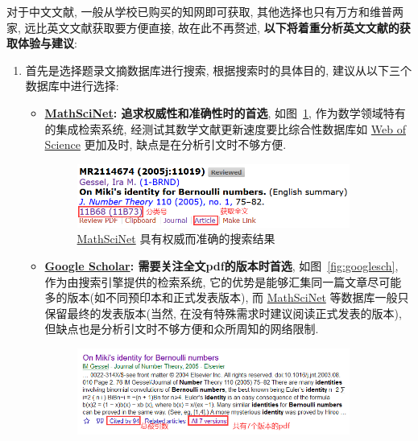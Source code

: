 \documentclass{formatBook}
\begin{document}
对于中文文献, 一般从学校已购买的知网即可获取, 其他选择也只有万方和维普两家, 远比英文文献获取要方便直接, 故在此不再赘述, \textbf{以下将着重分析英文文献的获取体验与建议}:
\begin{enumerate}
    \item 首先是选择题录文摘数据库进行搜索, 根据搜索时的具体目的, 建议从以下三个数据库中进行选择:
          \begin{itemize}
              \item \textbf{\href{https://mathscinet.ams.org/mathscinet}{MathSciNet}: 追求权威性和准确性时的首选}, 如图~\ref{fig:mathscinet}, 作为数学领域特有的集成检索系统, 经测试其数学文献更新速度要比综合性数据库如 \href{http://apps.webofknowledge.com/}{Web of Science} 更加及时, 缺点是在分析引文时不够方便.
                    \begin{figure}[H]
                        \centering
                        \includegraphics[width=0.9\textwidth]{figure/mathscinet.png}
                        \caption{\href{https://mathscinet.ams.org/mathscinet}{MathSciNet} 具有权威而准确的搜索结果}
                        \label{fig:mathscinet}
                    \end{figure}
              \item \textbf{\href{https://scholar.google.com/}{Google Scholar}: 需要关注全文pdf的版本时首选}, 如图~\ref{fig:googlesch}, 作为由搜索引擎提供的检索系统, 它的优势是能够汇集同一篇文章尽可能多的版本(如不同预印本和正式发表版本), 而 \href{https://mathscinet.ams.org/mathscinet}{MathSciNet} 等数据库一般只保留最终的发表版本(当然, 在没有特殊需求时建议阅读正式发表的版本), 但缺点也是分析引文时不够方便和众所周知的网络限制.
                    \begin{figure}[H]
                        \centering
                        \includegraphics[width=0.9\textwidth]{figure/googlescholar.png}

\end{figure}
\end{itemize}
\end{enumerate}
\end{document}
